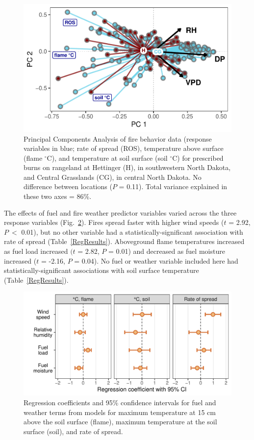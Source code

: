 \documentclass[referee, 
		     sn-basic]{sn-jnl}
\newcommand{\degC}{$^\circ$C}
\begin{document}
\begin{linenumbers}
\begin{figure} 
\includegraphics[width = 1\columnwidth]{pca_gg-1.pdf}
\caption{Principal Components Analysis of fire behavior data (response
variables in blue; rate of spread (ROS), temperature above surface
(flame \degC), and temperature at soil surface (soil \degC) for prescribed
burns on rangeland at Hettinger (H), in southwestern North Dakota, and
Central Grasslands (CG), in central North Dakota. No difference between
locations ($P$ = 0.11). 
Total variance explained in these two axes = 86\%.}
\label{PCA} %
\end{figure}

The effects of fuel and fire weather predictor variables varied across the three response variables (Fig.~\ref{CIs}). 
Fires spread faster with higher wind speeds ($t$ = 2.92, $P~<$ 0.01), but no other variable had a statistically-significant association with rate of spread (Table~\ref{RegResults}).
Aboveground flame temperatures increased as fuel load increased $(t$ = 2.82, $P$ = 0.01) and decreased as fuel moisture increased ($t$ = -2.16, $P$ = 0.04). 
No fuel or weather variable included here had statistically-significant associations with soil surface temperature (Table~\ref{RegResults}).

\begin{figure}
	\includegraphics[width = 1\columnwidth]{CI_gg-1.pdf}
	\caption{Regression coefficients and 95\% confidence intervals for fuel
		and weather terms from models for maximum temperature at 15 cm above the
		soil surface (flame), maximum temperature at the soil surface (soil),
		and rate of spread.}
	\label{CIs}
\end{figure}


\end{linenumbers}
\end{document}
